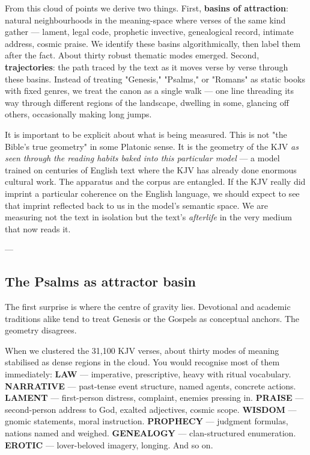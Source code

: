 \documentclass[12pt,a4paper]{article}
\begin{document}
From this cloud of points we derive two things. First, \textbf{basins of attraction}: natural neighbourhoods in the meaning-space where verses of the same kind gather --- lament, legal code, prophetic invective, genealogical record, intimate address, cosmic praise. We identify these basins algorithmically, then label them after the fact. About thirty robust thematic modes emerged. Second, \textbf{trajectories}: the path traced by the text as it moves verse by verse through these basins. Instead of treating "Genesis," "Psalms," or "Romans" as static books with fixed genres, we treat the canon as a single walk --- one line threading its way through different regions of the landscape, dwelling in some, glancing off others, occasionally making long jumps.

It is important to be explicit about what is being measured. This is not "the Bible's true geometry" in some Platonic sense. It is the geometry of the KJV \textit{as seen through the reading habits baked into this particular model} --- a model trained on centuries of English text where the KJV has already done enormous cultural work. The apparatus and the corpus are entangled. If the KJV really did imprint a particular coherence on the English language, we should expect to see that imprint reflected back to us in the model's semantic space. We are measuring not the text in isolation but the text's \textit{afterlife} in the very medium that now reads it.

---

\subsection{The Psalms as attractor basin}

The first surprise is where the centre of gravity lies. Devotional and academic traditions alike tend to treat Genesis or the Gospels as conceptual anchors. The geometry disagrees.

When we clustered the 31,100 KJV verses, about thirty modes of meaning stabilised as dense regions in the cloud. You would recognise most of them immediately: \textbf{LAW} --- imperative, prescriptive, heavy with ritual vocabulary. \textbf{NARRATIVE} --- past-tense event structure, named agents, concrete actions. \textbf{LAMENT} --- first-person distress, complaint, enemies pressing in. \textbf{PRAISE} --- second-person address to God, exalted adjectives, cosmic scope. \textbf{WISDOM} --- gnomic statements, moral instruction. \textbf{PROPHECY} --- judgment formulas, nations named and weighed. \textbf{GENEALOGY} --- clan-structured enumeration. \textbf{EROTIC} --- lover-beloved imagery, longing. And so on.
\end{document}
